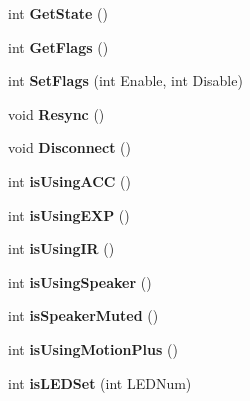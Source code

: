 \begin{DoxyCompactItemize}
\item 
\hypertarget{class_c_wiimote_a0b4b626beab4475fa349de8943c7b24f}{int {\bfseries Get\-State} ()}\label{class_c_wiimote_a0b4b626beab4475fa349de8943c7b24f}

\item 
\hypertarget{class_c_wiimote_a2900db59b2eb728f9db885ec1c9aa5e4}{int {\bfseries Get\-Flags} ()}\label{class_c_wiimote_a2900db59b2eb728f9db885ec1c9aa5e4}

\item 
\hypertarget{class_c_wiimote_a4efceeac77af5f1e8ca1418841b000b6}{int {\bfseries Set\-Flags} (int Enable, int Disable)}\label{class_c_wiimote_a4efceeac77af5f1e8ca1418841b000b6}

\item 
\hypertarget{class_c_wiimote_a26cd4594fecee2158f4c11a079cad904}{void {\bfseries Resync} ()}\label{class_c_wiimote_a26cd4594fecee2158f4c11a079cad904}

\item 
\hypertarget{class_c_wiimote_ad20d26c4cbf0d9b0e4ca26a5d9efed29}{void {\bfseries Disconnect} ()}\label{class_c_wiimote_ad20d26c4cbf0d9b0e4ca26a5d9efed29}

\item 
\hypertarget{class_c_wiimote_a25de8c4f00761781102b8fe47227d756}{int {\bfseries is\-Using\-A\-C\-C} ()}\label{class_c_wiimote_a25de8c4f00761781102b8fe47227d756}

\item 
\hypertarget{class_c_wiimote_a1b286b312e419b6181910abc98f44e0d}{int {\bfseries is\-Using\-E\-X\-P} ()}\label{class_c_wiimote_a1b286b312e419b6181910abc98f44e0d}

\item 
\hypertarget{class_c_wiimote_a21eba355433ba66dc42f6b8295ac2f74}{int {\bfseries is\-Using\-I\-R} ()}\label{class_c_wiimote_a21eba355433ba66dc42f6b8295ac2f74}

\item 
\hypertarget{class_c_wiimote_a7427d9d78869c5b3c7deaa25a0f61a3e}{int {\bfseries is\-Using\-Speaker} ()}\label{class_c_wiimote_a7427d9d78869c5b3c7deaa25a0f61a3e}

\item 
\hypertarget{class_c_wiimote_abf98cf75df5eb68d878ea6abe5eea726}{int {\bfseries is\-Speaker\-Muted} ()}\label{class_c_wiimote_abf98cf75df5eb68d878ea6abe5eea726}

\item 
\hypertarget{class_c_wiimote_a8549efa36985e03294333def36878516}{int {\bfseries is\-Using\-Motion\-Plus} ()}\label{class_c_wiimote_a8549efa36985e03294333def36878516}

\item 
\hypertarget{class_c_wiimote_a66043d17813c93bc528ae05e0cc4b8d1}{int {\bfseries is\-L\-E\-D\-Set} (int L\-E\-D\-Num)}\label{class_c_wiimote_a66043d17813c93bc528ae05e0cc4b8d1}

\end{DoxyCompactItemize}
